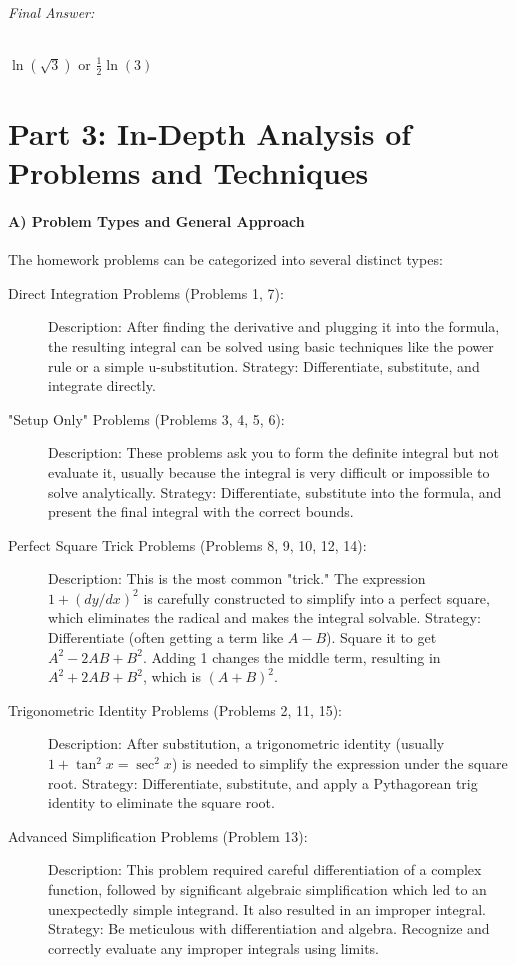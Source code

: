 \documentclass{article}
\begin{document}
\paragraph{Final Answer:} $\ln(\sqrt{3})$ or $\frac{1}{2}\ln(3)$

\part*{Part 3: In-Depth Analysis of Problems and Techniques}
\subsection*{A) Problem Types and General Approach}
The homework problems can be categorized into several distinct types:
\begin{description}
    \item[Direct Integration Problems (Problems 1, 7):]
    \subitem Description: After finding the derivative and plugging it into the formula, the resulting integral can be solved using basic techniques like the power rule or a simple u-substitution.
    \subitem Strategy: Differentiate, substitute, and integrate directly.
    
    \item["Setup Only" Problems (Problems 3, 4, 5, 6):]
    \subitem Description: These problems ask you to form the definite integral but not evaluate it, usually because the integral is very difficult or impossible to solve analytically.
    \subitem Strategy: Differentiate, substitute into the formula, and present the final integral with the correct bounds.
    
    \item[Perfect Square Trick Problems (Problems 8, 9, 10, 12, 14):]
    \subitem Description: This is the most common "trick." The expression $1 + (dy/dx)^2$ is carefully constructed to simplify into a perfect square, which eliminates the radical and makes the integral solvable.
    \subitem Strategy: Differentiate (often getting a term like $A - B$). Square it to get $A^2 - 2AB + B^2$. Adding 1 changes the middle term, resulting in $A^2 + 2AB + B^2$, which is $(A + B)^2$.
    
    \item[Trigonometric Identity Problems (Problems 2, 11, 15):]
    \subitem Description: After substitution, a trigonometric identity (usually $1 + \tan^2x = \sec^2x$) is needed to simplify the expression under the square root.
    \subitem Strategy: Differentiate, substitute, and apply a Pythagorean trig identity to eliminate the square root.
    
    \item[Advanced Simplification Problems (Problem 13):]
    \subitem Description: This problem required careful differentiation of a complex function, followed by significant algebraic simplification which led to an unexpectedly simple integrand. It also resulted in an improper integral.
    \subitem Strategy: Be meticulous with differentiation and algebra. Recognize and correctly evaluate any improper integrals using limits.
\end{description}
\end{document}
